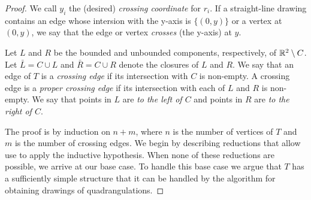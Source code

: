\documentclass{patmorin}
\begin{document}
\begin{proof}
   We call $y_i$ the (desired) \emph{crossing coordinate} for $r_i$. If
   a straight-line drawing contains an edge whose intersion with the
   y-axis is $\{(0,y)\}$ or a vertex at $(0,y)$, we say that the edge
   or vertex \emph{crosses} (the y-axis) at $y$.

   Let $L$ and $R$ be the bounded and unbounded components, respectively,
   of $\mathbb{R}^2\setminus C$. Let $\bar{L}=C\cup L$ and $\bar{R}=C\cup R$
   denote the closures of $L$ and $R$.  We say that an edge of $T$ is
   a \emph{crossing edge} if its intersection with $C$ is non-empty.
   A crossing edge is a \emph{proper crossing edge} if its intersection
   with each of $L$ and $R$ is non-empty.  We say that points in $L$
   are \emph{to the left of $C$} and points in $R$ are \emph{to the
   right of $C$}.


%

   The proof is by induction on $n+m$, where $n$ is the number of
   vertices of $T$ and $m$ is the number of crossing edges.  We begin
   by describing reductions that allow use to apply the inductive
   hypothesis. When none of these reductions are possible, we arrive
   at our base case. To handle this base case we argue that $T$ has a
   sufficiently simple structure that it can be handled by the algorithm
   for obtaining drawings of quadrangulations.


\end{proof}
\end{document}
